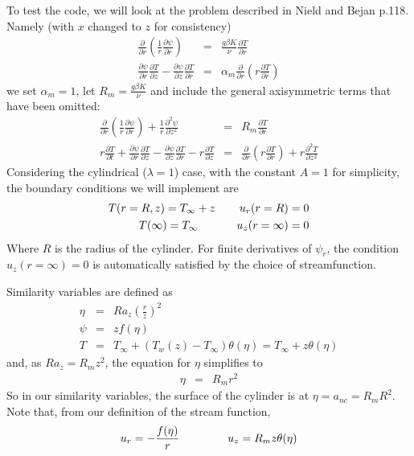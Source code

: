 \documentclass{article}
\begin{document}
To test the code, we will look at the problem described in Nield and Bejan p.118. Namely (with $x$ changed to $z$ for consistency)
\begin{eqnarray}
\frac{\partial}{\partial r} \left( \frac{1}{r} \frac{\partial \psi}{\partial r} \right) &=& \frac{g \beta K}{\nu} \frac{\partial T}{\partial r} \\
\frac{\partial \psi}{\partial r} \frac{\partial T}{\partial z} - \frac{\partial \psi}{\partial z} \frac{\partial T}{\partial r} &=& \alpha_m \frac{\partial}{\partial r} \left(r \frac{\partial T}{\partial r} \right)
\end{eqnarray}
we set $\alpha_m = 1$, let $R_m =  \frac{g \beta K}{\nu}$ and include the general axisymmetric terms that have been omitted:
\begin{eqnarray}
\frac{\partial}{\partial r} \left( \frac{1}{r} \frac{\partial \psi}{\partial r} \right) + \frac{1}{r}\frac{\partial^2 \psi}{\partial z^2} &=& R_m \frac{\partial T}{\partial r} \\
r \frac{\partial T}{\partial t} + \frac{\partial \psi}{\partial r} \frac{\partial T}{\partial z} - \frac{\partial \psi}{\partial z} \frac{\partial T}{\partial r} - r \frac{\partial T}{\partial z} &=& \frac{\partial}{\partial r} \left(r \frac{\partial T}{\partial r} \right) + r \frac{\partial^2 T}{\partial z^2}
\end{eqnarray}
Considering the cylindrical ($\lambda = 1$) case, with the constant $A=1$ for simplicity, the boundary conditions we will implement are
\begin{eqnarray}
T(r=R, z) = T_\infty + z \hspace{5ex} u_r(r=R) = 0 \\
T(\infty) = T_\infty \hspace{8ex} u_z(r=\infty) = 0
\end{eqnarray}
Where $R$ is the radius of the cylinder. For finite derivatives of $\psi_r$, the condition $u_z(r=\infty) = 0$ is automatically satisfied by the choice of streamfunction.

Similarity variables are defined as
\begin{eqnarray}
\eta &=& Ra_z \left( \frac{r}{z} \right)^2 \\
\psi &=& z f(\eta) \label{eq:psi-analytic-axisymm} \\
T &=& T_\infty + (T_w(z) - T_\infty) \theta(\eta) = T_\infty + z \theta(\eta)
\end{eqnarray}
and, as $Ra_z = R_m z^2$, the equation for $\eta$ simplifies to
\begin{eqnarray}
\eta &=& R_m r^2
\end{eqnarray}
So in our similarity variables, the surface of the cylinder is at $\eta = a_{nc} = R_m R^2$. Note that, from our definition of the stream function,
\begin{eqnarray}
u_r = - \frac{f(\eta)}{r} \hspace{10ex} u_z = R_m z \theta(\eta)
\end{eqnarray}
\end{document}
